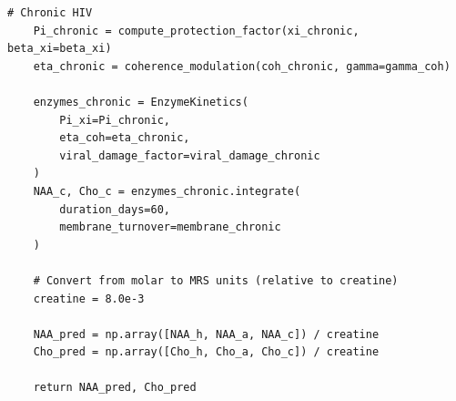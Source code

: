 \documentclass[11pt]{article}
\begin{document}
\begin{lstlisting}[caption={Enzyme Kinetics Model - Forward Model (Lines 77--166)}]
    # Chronic HIV
    Pi_chronic = compute_protection_factor(xi_chronic, beta_xi=beta_xi)
    eta_chronic = coherence_modulation(coh_chronic, gamma=gamma_coh)

    enzymes_chronic = EnzymeKinetics(
        Pi_xi=Pi_chronic,
        eta_coh=eta_chronic,
        viral_damage_factor=viral_damage_chronic
    )
    NAA_c, Cho_c = enzymes_chronic.integrate(
        duration_days=60,
        membrane_turnover=membrane_chronic
    )

    # Convert from molar to MRS units (relative to creatine)
    creatine = 8.0e-3

    NAA_pred = np.array([NAA_h, NAA_a, NAA_c]) / creatine
    Cho_pred = np.array([Cho_h, Cho_a, Cho_c]) / creatine

    return NAA_pred, Cho_pred
\end{lstlisting}
\end{document}
